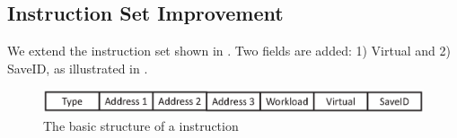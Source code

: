 \subsection{ Instruction Set Improvement }
\label{sec:virtualinstr}

We extend the instruction set shown in . Two fields are added: 1) Virtual and 2) SaveID, as illustrated in .

\begin{figure}[h]
	\centering
	\includegraphics[width=0.9\linewidth]{fig/virtual_instr.eps}
	\caption{The basic structure of a instruction }
	\label{fig:virtual_instr}
\end{figure}



